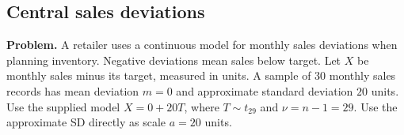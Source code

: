 \subsection{Central sales deviations}
\label{c8-i4}
\textbf{Problem.} A retailer uses a continuous model for monthly sales deviations when planning inventory. Negative deviations mean sales below target. Let $X$ be monthly sales minus its target, measured in units. A sample of 30 monthly sales records has mean deviation $m=0$ and approximate standard deviation $20$ units. Use the supplied model $X=0+20T$, where $T\sim t_{29}$ and $\nu=n-1=29$. Use the approximate SD directly as scale $a=20$ units.
